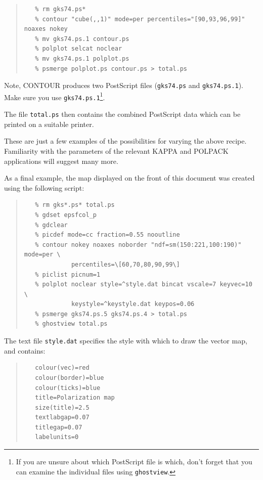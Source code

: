 \documentclass[twoside,11pt]{article}
\renewcommand{\_}{\texttt{\symbol{95}}}
\newenvironment{myquote}{\begin{quote}\begin{small}}{\end{small}\end{quote}}
\begin{document}
\begin{itemize}
\begin{myquote}
\begin{verbatim}
   % rm gks74.ps*
   % contour "cube(,,1)" mode=per percentiles="[90,93,96,99]" noaxes nokey
   % mv gks74.ps.1 contour.ps
   % polplot selcat noclear 
   % mv gks74.ps.1 polplot.ps
   % psmerge polplot.ps contour.ps > total.ps
\end{verbatim}
\end{myquote}

Note, CONTOUR produces two PostScript files (\verb+gks74.ps+ and
\verb+gks74.ps.1+). Make sure you use \verb+gks74.ps.1+\footnote{If you are
unsure about which PostScript file is which, don't forget that you can
examine the individual files using \texttt{ghostview}.}.

The file \verb+total.ps+ then  contains the combined PostScript data
which can be printed on a suitable printer.

\end{itemize}

These are just a few examples of the possibilities for varying the above
recipe. Familiarity with the parameters of the relevant KAPPA and POLPACK
applications will suggest many more.

As a final  example, the map displayed on the front of this document was
created using the following script:

\begin{myquote}
\begin{verbatim}
   % rm gks*.ps* total.ps
   % gdset epsfcol_p
   % gdclear
   % picdef mode=cc fraction=0.55 nooutline
   % contour nokey noaxes noborder "ndf=sm(150:221,100:190)" mode=per \
             percentiles=\[60,70,80,90,99\]
   % piclist picnum=1
   % polplot noclear style=^style.dat bincat vscale=7 keyvec=10 \
             keystyle=^keystyle.dat keypos=0.06
   % psmerge gks74.ps.5 gks74.ps.4 > total.ps
   % ghostview total.ps
\end{verbatim}
\end{myquote}

The text file \texttt{style.dat} specifies the style with which to draw the 
vector map, and contains:

\begin{myquote}
\begin{verbatim}
   colour(vec)=red
   colour(border)=blue
   colour(ticks)=blue
   title=Polarization map
   size(title)=2.5
   textlabgap=0.07
   titlegap=0.07
   labelunits=0
\end{verbatim}
\end{myquote}
\end{document}
